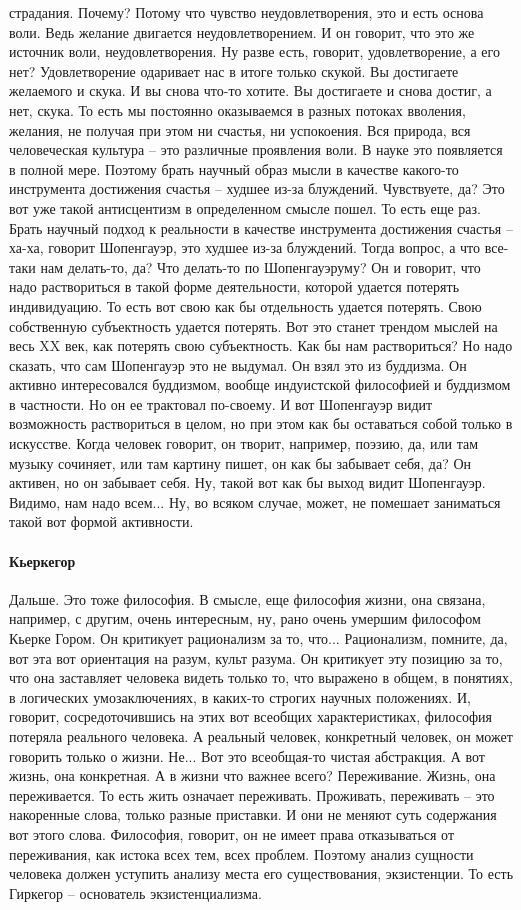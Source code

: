 страдания. Почему? Потому что чувство неудовлетворения, это и есть основа воли.
Ведь желание двигается неудовлетворением. И он говорит, что это же источник
воли, неудовлетворения. Ну разве есть, говорит, удовлетворение, а его нет?
Удовлетворение одаривает нас в итоге только скукой. Вы достигаете желаемого и
скука. И вы снова что-то хотите. Вы достигаете и снова достиг, а нет, скука. То
есть мы постоянно оказываемся в разных потоках вволения, желания, не получая при
этом ни счастья, ни успокоения. Вся природа, вся человеческая культура – это
различные проявления воли. В науке это появляется в полной мере. Поэтому брать
научный образ мысли в качестве какого-то инструмента достижения счастья – худшее
из-за блуждений. Чувствуете, да? Это вот уже такой антисцентизм в определенном
смысле пошел. То есть еще раз. Брать научный подход к реальности в качестве
инструмента достижения счастья – ха-ха, говорит Шопенгауэр, это худшее из-за
блуждений. Тогда вопрос, а что все-таки нам делать-то, да? Что делать-то по
Шопенгауэруму? Он и говорит, что надо раствориться в такой форме деятельности,
которой удается потерять индивидуацию. То есть вот свою как бы отдельность
удается потерять. Свою собственную субъектность удается потерять. Вот это станет
трендом мыслей на весь XX век, как потерять свою субъектность. Как бы нам
раствориться? Но надо сказать, что сам Шопенгауэр это не выдумал. Он взял это из
буддизма. Он активно интересовался буддизмом, вообще индуистской философией и
буддизмом в частности. Но он ее трактовал по-своему. И вот Шопенгауэр видит
возможность раствориться в целом, но при этом как бы оставаться собой только в
искусстве. Когда человек говорит, он творит, например, поэзию, да, или там
музыку сочиняет, или там картину пишет, он как бы забывает себя, да? Он активен,
но он забывает себя. Ну, такой вот как бы выход видит Шопенгауэр. Видимо, нам
надо всем... Ну, во всяком случае, может, не помешает заниматься такой вот
формой активности. 

\paragraph{Кьеркегор}
Дальше. Это тоже философия. В смысле, еще философия жизни,
она связана, например, с другим, очень интересным, ну, рано очень умершим
философом Кьерке Гором. Он критикует рационализм за то, что... Рационализм,
помните, да, вот эта вот ориентация на разум, культ разума. Он критикует эту
позицию за то, что она заставляет человека видеть только то, что выражено в
общем, в понятиях, в логических умозаключениях, в каких-то строгих научных
положениях. И, говорит, сосредоточившись на этих вот всеобщих характеристиках,
философия потеряла реального человека. А реальный человек, конкретный человек,
он может говорить только о жизни. Не... Вот это всеобщая-то чистая абстракция. А
вот жизнь, она конкретная. А в жизни что важнее всего? Переживание. Жизнь, она
переживается. То есть жить означает переживать. Проживать, переживать – это
накоренные слова, только разные приставки. И они не меняют суть содержания вот
этого слова. Философия, говорит, он не имеет права отказываться от переживания,
как истока всех тем, всех проблем. Поэтому анализ сущности человека должен
уступить анализу места его существования, экзистенции. То есть Гиркегор –
основатель экзистенциализма. 

